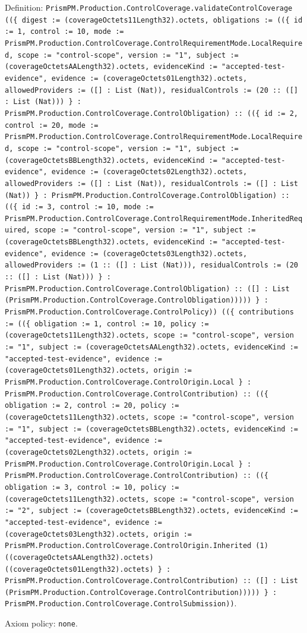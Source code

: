 \documentclass[11pt]{article}
\begin{document}
\noindent Definition: \texttt{PrismPM.Production.ControlCoverage.validateControlCoverage ((\{ digest := (coverageOctets11Length32).octets, obligations := ((\{ id := 1, control := 10, mode := PrismPM.Production.ControlCoverage.ControlRequirementMode.LocalRequired, scope := "control-scope", version := "1", subject := (coverageOctetsAALength32).octets, evidenceKind := "accepted-test-evidence", evidence := (coverageOctets01Length32).octets, allowedProviders := ([] : List (Nat)), residualControls := (20 :: ([] : List (Nat))) \} : PrismPM.Production.ControlCoverage.ControlObligation) :: ((\{ id := 2, control := 20, mode := PrismPM.Production.ControlCoverage.ControlRequirementMode.LocalRequired, scope := "control-scope", version := "1", subject := (coverageOctetsBBLength32).octets, evidenceKind := "accepted-test-evidence", evidence := (coverageOctets02Length32).octets, allowedProviders := ([] : List (Nat)), residualControls := ([] : List (Nat)) \} : PrismPM.Production.ControlCoverage.ControlObligation) :: ((\{ id := 3, control := 10, mode := PrismPM.Production.ControlCoverage.ControlRequirementMode.InheritedRequired, scope := "control-scope", version := "1", subject := (coverageOctetsBBLength32).octets, evidenceKind := "accepted-test-evidence", evidence := (coverageOctets03Length32).octets, allowedProviders := (1 :: ([] : List (Nat))), residualControls := (20 :: ([] : List (Nat))) \} : PrismPM.Production.ControlCoverage.ControlObligation) :: ([] : List (PrismPM.Production.ControlCoverage.ControlObligation))))) \} : PrismPM.Production.ControlCoverage.ControlPolicy)) ((\{ contributions := ((\{ obligation := 1, control := 10, policy := (coverageOctets11Length32).octets, scope := "control-scope", version := "1", subject := (coverageOctetsAALength32).octets, evidenceKind := "accepted-test-evidence", evidence := (coverageOctets01Length32).octets, origin := PrismPM.Production.ControlCoverage.ControlOrigin.Local \} : PrismPM.Production.ControlCoverage.ControlContribution) :: ((\{ obligation := 2, control := 20, policy := (coverageOctets11Length32).octets, scope := "control-scope", version := "1", subject := (coverageOctetsBBLength32).octets, evidenceKind := "accepted-test-evidence", evidence := (coverageOctets02Length32).octets, origin := PrismPM.Production.ControlCoverage.ControlOrigin.Local \} : PrismPM.Production.ControlCoverage.ControlContribution) :: ((\{ obligation := 3, control := 10, policy := (coverageOctets11Length32).octets, scope := "control-scope", version := "2", subject := (coverageOctetsBBLength32).octets, evidenceKind := "accepted-test-evidence", evidence := (coverageOctets03Length32).octets, origin := PrismPM.Production.ControlCoverage.ControlOrigin.Inherited (1) ((coverageOctetsAALength32).octets) ((coverageOctets01Length32).octets) \} : PrismPM.Production.ControlCoverage.ControlContribution) :: ([] : List (PrismPM.Production.ControlCoverage.ControlContribution))))) \} : PrismPM.Production.ControlCoverage.ControlSubmission))}.\par
\noindent Axiom policy: \texttt{none}.\par
\end{document}
